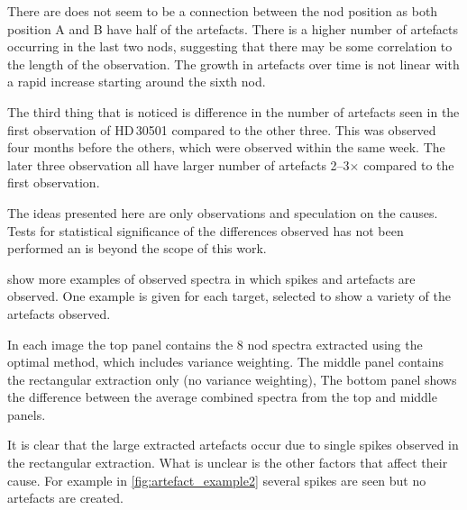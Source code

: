 There are does not seem to be a connection between the nod position as both position A and B have half of the artefacts.
There is a higher number of artefacts occurring in the last two nods, suggesting that there may be some correlation to the length of the observation.
The growth in artefacts over time is not linear with a rapid increase starting around the sixth nod.

The third thing that is noticed is difference in the number of artefacts seen in the first observation of HD\,30501 compared to the other three.
This was observed four months before the others, which were observed within the same week.
The later three observation all have larger number of artefacts 2--3$\times$ compared to the first observation.

The ideas presented here are only observations and speculation on the causes.
Tests for statistical significance of the differences observed has not been performed an is beyond the scope of this work.


 show more examples of observed spectra in which spikes and artefacts are observed.
One example is given for each target, selected to show a variety of the artefacts observed.

In each image the top panel contains the 8 nod spectra extracted using the optimal method, which includes variance weighting.
The middle panel contains the rectangular extraction only (no variance weighting), The bottom panel shows the difference between the average combined spectra from the top and middle panels.

It is clear that the large extracted artefacts occur due to single spikes observed in the rectangular extraction.
What is unclear is the other factors that affect their cause.
For example in \cref{fig:artefact_example2} several spikes are seen but no artefacts are created.

